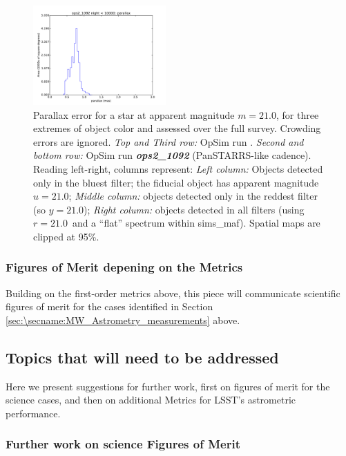 \begin{figure}[ht]
\begin{center}
  \includegraphics[width=2.0in]{./figs/milkyway/MW_Astrom_paError_1092_10y_hst.pdf}
  \end{center}
  \caption{Parallax error for a star at apparent magnitude $m=21.0$, for three extremes of object color and assessed over the full survey. Crowding errors are ignored. {\it Top and Third row:} OpSim run . {\it Second and bottom row:} OpSim run {\it \bf ops2\_1092} (PanSTARRS-like cadence). Reading left-right, columns represent: {\it Left column:} Objects detected only in the bluest filter; the fiducial object has apparent magnitude $u=21.0$; {\it Middle column:} objects detected only in the reddest filter (so $y = 21.0$); {\it Right column:} objects detected in all filters (using $r=21.0$~and a ``flat'' spectrum within sims\_maf). Spatial maps are clipped at 95\%.}
  \label{fig_astrom_ByFilter_paError}
\end{figure}

\subsubsection{Figures of Merit depening on the Metrics}

Building on the first-order metrics above, this piece will communicate scientific figures of merit for the cases identified in Section \ref{sec:\secname:MW_Astrometry_measurements} above.

\subsection{Topics that will need to be addressed}
\label{sec:\secname:MW_Astrometry_furtherwork}

Here we present suggestions for further work, first on figures of
merit for the science cases, and then on additional Metrics for LSST's
astrometric performance.

\subsubsection{Further work on science Figures of Merit}


